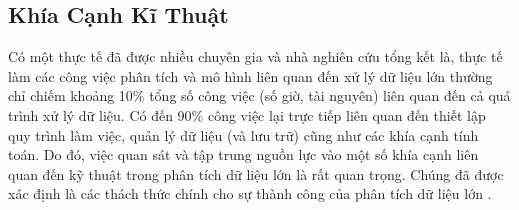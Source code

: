 \documentclass[utf8]{frontiersSCNS} %
\begin{document}




\subsection{Khía Cạnh Kĩ Thuật}
Có một thực tế đã được nhiều chuyên gia và nhà nghiên cứu tổng kết là, thực tế làm các công việc phân tích và mô hình liên quan đến xử lý dữ liệu lớn thường chỉ chiếm khoảng 10\% tổng số công việc (số giờ, tài nguyên) liên quan đến cả quá trình xử lý dữ liệu. Có đến 90\% công việc lại trực tiếp liên quan đến thiết lập quy trình làm việc, quản lý dữ liệu (và lưu trữ) cũng như các khía cạnh tính toán. Do đó, việc quan sát và tập trung nguồn lực vào một số khía cạnh liên quan đến kỹ thuật trong phân tích dữ liệu lớn là rất quan trọng. Chúng đã được xác định là các thách thức chính cho sự thành công của phân tích dữ liệu lớn \citep{Wickham2023}.
\end{document}
